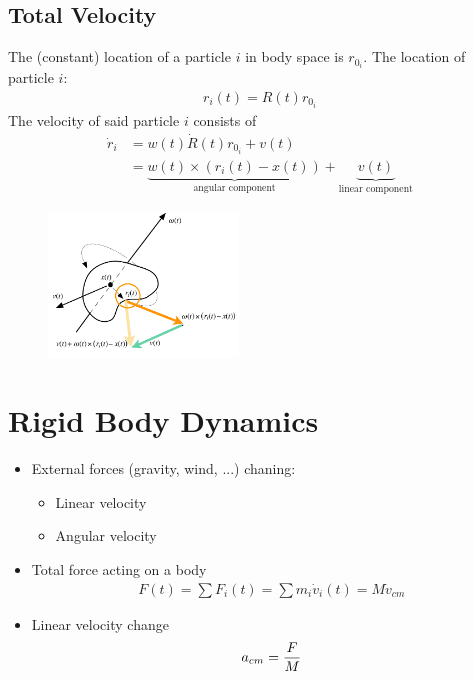 \begin{multicols}{2}
\subsection{Total Velocity}
The (constant) location of a particle $i$ in body space is $r_{0_i}$. The location of particle $i$:
\begin{align*}
	r_i(t) = R(t)r_{0_i}
\end{align*}
The velocity of said particle $i$ consists of 
\begin{align*}
\dot r_i &= w(t) \dot R(t) r_{0_i} + v(t)\\
 &= \underbrace{w(t) \times (r_i(t) - x(t))}_\text{angular component} + \underbrace{v(t)}_\text{linear component}
\end{align*}
\begin{figure}[H]
	\centering
	\includegraphics[width=0.45\textwidth]{img/04_total_velocity}
\end{figure}

\section{Rigid Body Dynamics}
\begin{itemize}
	\item External forces (gravity, wind, ...) chaning:
		\begin{itemize}
			\item Linear velocity
			\item Angular velocity
		\end{itemize}
	\item Total force acting on a body
		\begin{align*}
			F(t) = \sum F_i(t) = \sum m_i \dot v_i(t) = M \dot v_{cm}
		\end{align*}
	\item Linear velocity change
		\begin{align*}
			a_{cm} = {F \over M}
		\end{align*}


\end{itemize}



\end{multicols}
